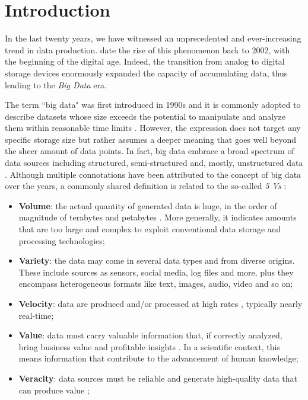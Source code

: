 \chapter{Introduction}\label{ch:opint_intro}


In the last twenty years, we have witnessed an unprecedented and ever-increasing trend in data production. 
 date the rise of this phenomenon back to 2002, with the beginning of the digital age.
Indeed, the transition from analog to digital storage devices enormously expanded the capacity of accumulating data, thus leading to the \emph{Big Data} era.

The term ``big data" was first introduced in 1990s \cite{16, 17} and it is commonly adopted to describe datasets whose size exceeds the potential to manipulate and analyze them within reasonable time limits \cite{snijders2012big}.
However, the expression does not target any specific storage size but rather assumes a deeper meaning that goes well beyond the sheer amount of data points.
In fact, big data embrace a broad spectrum of data sources including structured, semi-structured and, mostly, unstructured data \cite{dedic2016towards}.
Although multiple connotations have been attributed to the concept of big data over the years, a commonly shared definition is related to the so-called \emph{5 Vs} \cite{3}:

\begin{itemize}
    \item \textbf{Volume}: the actual quantity of generated data is huge, in the order of magnitude of terabytes and petabytes \cite{sagiroglu2013big}. More generally, it indicates amounts that are too large and complex to exploit conventional data storage and processing technologies;
    
    \item \textbf{Variety}: the data may come in several data types and from diverse origins. These include sources as sensors, social media, log files and more, plus they encompass heterogeneous formats like text, images, audio, video and so on; 
    
    \item \textbf{Velocity}: data are produced and/or processed at high rates \cite{kitchin2016makes}, typically nearly real-time;
    
    \item \textbf{Value}: data must carry valuable information that, if correctly analyzed, bring business value and profitable insights \cite{uddin2014seven}. In a scientific context, this means information that contribute to the advancement of human knowledge;
    
    \item \textbf{Veracity}: data sources must be reliable and generate high-quality data that can produce value \cite{onay2018review, 33};


\end{itemize}


